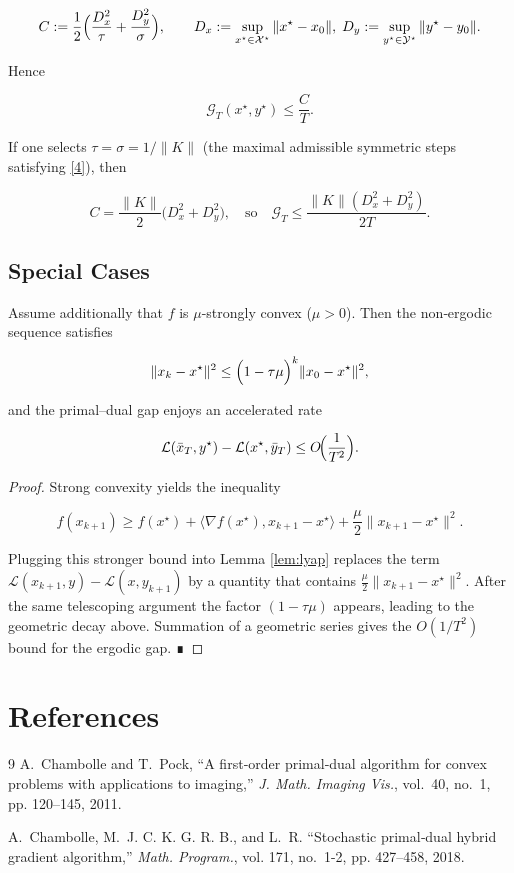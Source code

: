 \documentclass{article}
\begin{document}
\[
C:=\frac{1}{2}\Bigl(\frac{D_{x}^{2}}{\tau}+\frac{D_{y}^{2}}{\sigma}\Bigr),
\qquad
D_{x}:=\sup_{x^{\star}\in\mathcal{X}^{\star}}\|x^{\star}-x_{0}\|,
\; D_{y}:=\sup_{y^{\star}\in\mathcal{Y}^{\star}}\|y^{\star}-y_{0}\|.
\]

Hence  

\[
\mathcal{G}_{T}(x^{\star},y^{\star})\le \frac{C}{T}.
\]

If one selects \(\tau=\sigma=1/\|K\|\) (the maximal admissible symmetric steps satisfying \eqref{4}), then  

\[
C=\frac{\|K\|}{2}\bigl(D_{x}^{2}+D_{y}^{2}\bigr),
\quad\text{so}\quad
\mathcal{G}_{T}\le \frac{\|K\|(D_{x}^{2}+D_{y}^{2})}{2T}.
\]

\subsection*{Special Cases}
\begin{corollary}\label{cor:strong}
Assume additionally that \(f\) is \(\mu\)-strongly convex (\(\mu>0\)). Then the non‑ergodic sequence satisfies  

\[
\|x_{k}-x^{\star}\|^{2}\le
\Bigl(1-\tau\mu\Bigr)^{k}\|x_{0}-x^{\star}\|^{2},
\]

and the primal–dual gap enjoys an accelerated rate  

\[
\mathcal{L}(\bar{x}_{T},y^{\star})-\mathcal{L}(x^{\star},\bar{y}_{T})
\le O\!\Bigl(\frac{1}{T^{2}}\Bigr).
\]
\end{corollary}
\begin{proof}
Strong convexity yields the inequality  

\[
f(x_{k+1})\ge f(x^{\star})+\langle \nabla f(x^{\star}),x_{k+1}-x^{\star}\rangle+\frac{\mu}{2}\|x_{k+1}-x^{\star}\|^{2}.
\]

Plugging this stronger bound into Lemma \ref{lem:lyap} replaces the term \(\mathcal{L}(x_{k+1},y)-\mathcal{L}(x,y_{k+1})\) by a quantity that contains \(\frac{\mu}{2}\|x_{k+1}-x^{\star}\|^{2}\). After the same telescoping argument the factor \((1-\tau\mu)\) appears, leading to the geometric decay above. Summation of a geometric series gives the \(O(1/T^{2})\) bound for the ergodic gap. ∎
\end{proof}

\newpage
\section*{References}
\begin{thebibliography}{9}
A.~Chambolle and T.~Pock, “A first‑order primal‑dual algorithm for convex problems with applications to imaging,” \emph{J. Math. Imaging Vis.}, vol.~40, no.~1, pp. 120–145, 2011.

A.~Chambolle, M.~J. C. K. G. R. B., and L.~R. “Stochastic primal‑dual hybrid gradient algorithm,” \emph{Math. Program.}, vol. 171, no.~1-2, pp. 427–458, 2018.
\end{thebibliography}
\end{document}
